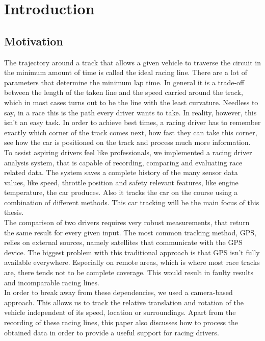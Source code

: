 \section{Introduction}
\label{sec:intro}

\subsection{Motivation}
The trajectory around a track that allows a given vehicle to traverse the circuit in the minimum amount of time is called the ideal racing line. There are a lot of parameters that determine the minimum lap time. In general it is a trade-off between the length of the taken line and the speed carried around the track, which in most cases turns out to be the line with the least curvature.  
Needless to say, in a race this is the path every driver wants to take. In reality, however, this isn't an easy task. In order to achieve best times, a racing driver has to remember exactly which corner of the track comes next, how fast they can take this corner, see how the car is positioned on the track and process much more information.\\
To assist aspiring drivers feel like professionals, we implemented a racing driver analysis system, that is capable of recording, comparing and evaluating race related data. The system saves a complete history of the many sensor data values, like speed, throttle position and safety relevant features, like engine temperature, the car produces. Also it tracks the car on the course using a combination of different methods.
This car tracking will be the main focus of this thesis. \\
The comparison of two drivers requires very robust measurements, that return the same result for every given input.
The most common tracking method, GPS, relies on external sources, namely satellites that communicate with the GPS device. The biggest problem with this traditional approach is that GPS isn't fully available everywhere. Especially on remote areas, which is where most race tracks are, there tends not to be complete coverage. This would result in faulty results and incomparable racing lines.\\
In order to break away from these dependencies, we used a camera-based approach. This allows us to track the relative translation and rotation of the vehicle independent of its speed, location or surroundings.
Apart from the recording of these racing lines, this paper also discusses how to process the obtained data in order to provide a useful support for racing drivers.

